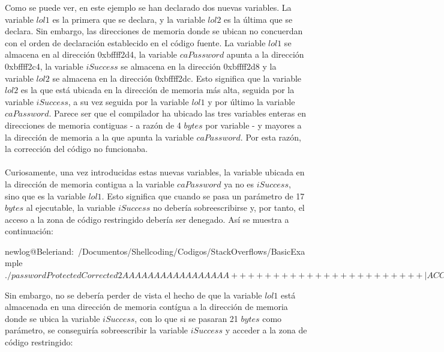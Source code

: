 \documentclass [titlepage, 12pt]{article}
\begin{document}
Como se puede ver, en este ejemplo se han declarado dos nuevas variables. La variable $lol1$ es la primera que se declara, y la variable $lol2$ es la \'ultima que se declara. Sin embargo, las direcciones de memoria donde se ubican no concuerdan con el orden de declaraci\'on establecido en el c\'odigo fuente. La variable $lol1$ se almacena en al direcci\'on 0xbffff2d4, la variable $caPassword$ apunta a la direcci\'on 0xbffff2c4, la variable $iSuccess$ se almacena en la direcci\'on 0xbffff2d8 y la variable $lol2$ se almacena en la direcci\'on 0xbffff2dc. Esto significa que la variable $lol2$ es la que est\'a ubicada en la direcci\'on de memoria m\'as alta, seguida por la variable $iSuccess$, a su vez seguida por la variable $lol1$ y por \'ultimo la variable $caPassword$. Parece ser que el compilador ha ubicado las tres variables enteras en direcciones de memoria contiguas - a raz\'on de 4 $bytes$ por variable - y mayores a la direcci\'on de memoria a la que apunta la variable $caPassword$. Por esta raz\'on, la correcci\'on del c\'odigo no funcionaba.\\
\\
Curiosamente, una vez introducidas estas nuevas variables, la variable ubicada en la direcci\'on de memoria contigua a la variable $caPassword$ ya no es $iSuccess$, sino que es la variable $lol1$. Esto significa que cuando se pasa un par\'ametro de 17 $bytes$ al ejecutable, la variable $iSuccess$ no deber\'ia sobreescribirse y, por tanto, el acceso a la zona de c\'odigo restringido deber\'ia ser denegado. As\'i se muestra a continuaci\'on:

\begin{listing}[style=consola, numbers=none, caption=Vulnerabilidad corregida err\'oneamente]	
newlog@Beleriand:~/Documentos/Shellcoding/Codigos/StackOverflows/BasicExample$ ./passwordProtectedCorrected2 AAAAAAAAAAAAAAAAA

+++++++++++++++++++++++

|    ACCESS DENIED    |

+++++++++++++++++++++++

newlog@Beleriand:~/Documentos/Shellcoding/Codigos/StackOverflows/BasicExample$ 
\end{listing}

Sin embargo, no se deber\'ia perder de vista el hecho de que la variable $lol1$ est\'a almacenada en una direcci\'on de memoria cont\'igua a la direcci\'on de memoria donde se ubica la variable $iSuccess$, con lo que si se pasaran 21 $bytes$ como par\'ametro, se conseguir\'ia sobreescribir la variable $iSuccess$ y acceder a la zona de c\'odigo restringido:
\end{document}
